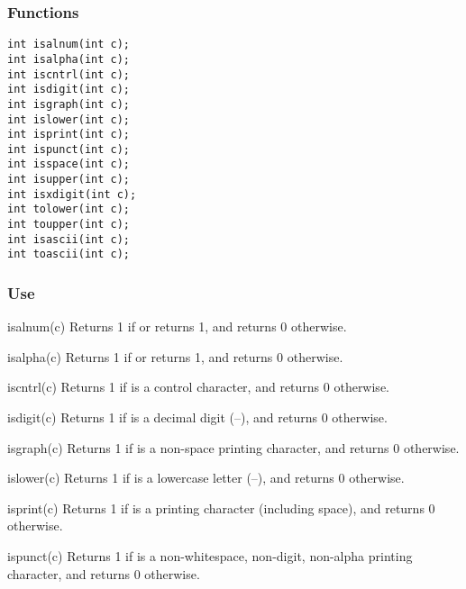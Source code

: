 \subsubsection*{Functions}
\begin{verbatim}
int isalnum(int c);
int isalpha(int c);
int iscntrl(int c);
int isdigit(int c);
int isgraph(int c);
int islower(int c);
int isprint(int c);
int ispunct(int c);
int isspace(int c);
int isupper(int c);
int isxdigit(int c);
int tolower(int c);
int toupper(int c);
int isascii(int c);
int toascii(int c);
\end{verbatim}

\subsubsection*{Use}

\begin{defun}{isalnum}{(c)}
Returns 1 if  or  returns 1,
and returns 0 otherwise.
\end{defun}

\begin{defun}{isalpha}{(c)}
Returns 1 if  or  returns 1,
and returns 0 otherwise.
\end{defun}

\begin{defun}{iscntrl}{(c)}
Returns 1 if  is a control character,
and returns 0 otherwise.
\end{defun}

\begin{defun}{isdigit}{(c)}
Returns 1 if  is a decimal digit (--), and
returns 0 otherwise.
\end{defun}

\begin{defun}{isgraph}{(c)}
Returns 1 if  is a non-space printing character, and returns 0
otherwise.
\end{defun}

\begin{defun}{islower}{(c)}
Returns 1 if  is a lowercase letter (--),
and returns 0 otherwise.
\end{defun}

\begin{defun}{isprint}{(c)}
Returns 1 if  is a printing character (including space), and
returns 0 otherwise.
\end{defun}

\begin{defun}{ispunct}{(c)}
Returns 1 if  is a non-whitespace, non-digit, non-alpha
printing character, and returns 0 otherwise.
\end{defun}

